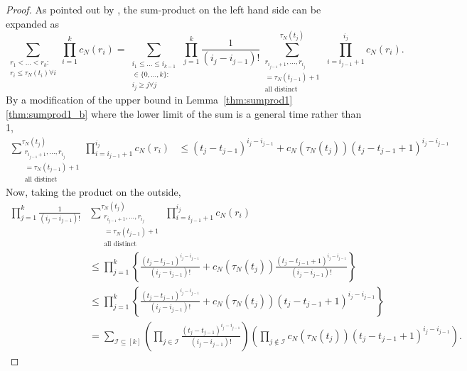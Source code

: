 \begin{proof}
As pointed out by \textcite[p.~460]{mohle1999}, the sum-product on the left hand side can be expanded as
\begin{equation*}
\sum_{\substack{r_1<\dots<r_k :\\ r_i\leq \tau_N(t_i) \forall i}} 
        \prod_{i=1}^k c_N(r_i)
= \sum_{\substack{i_1\leq \dots\leq i_{k-1}\\ \in \{0,\dots,k\} :\\ 
        i_j \geq j \forall j}} \, \prod_{j=1}^k \frac{1}{(i_j - i_{j-1})!}
        \sum_{\substack{ r_{i_{j-1}+1}, \ldots, r_{i_j} \\ = \tau_N(t_{j-1})+1 
        \\ \text{all distinct} }}^{\tau_N(t_j)}  
        \,\prod_{i=i_{j-1}+1}^{i_j} c_N(r_i) .
\end{equation*}
By a modification of the upper bound in Lemma~\ref{thm:sumprod1}\ref{thm:sumprod1_b} where the lower limit of the sum is a general time rather than 1,
\begin{align*}
\sum_{\substack{ r_{i_{j-1}+1}, \ldots, r_{i_j} \\ = \tau_N(t_{j-1})+1 
        \\ \text{all distinct} }}^{\tau_N(t_j)}  
        \prod_{i=i_{j-1}+1}^{i_j} c_N(r_i)
&\leq (t_j - t_{j-1})^{i_j - i_{j-1}} 
        + c_N(\tau_N(t_j)) ( t_j - t_{j-1} +1 )^{i_j - i_{j-1}}
\end{align*}
Now, taking the product on the outside,
\begin{align*}
\prod_{j=1}^k \frac{1}{(i_j - i_{j-1})!}
        &\sum_{\substack{ r_{i_{j-1}+1}, \ldots, r_{i_j} \\ = \tau_N(t_{j-1})+1 
        \\ \text{all distinct} }}^{\tau_N(t_j)}
        \,\prod_{i=i_{j-1}+1}^{i_j} c_N(r_i) \\
&\leq \prod_{j=1}^k \left\{ \frac{(t_j - t_{j-1})^{i_j - i_{j-1}}}{(i_j - i_{j-1})!}  
        + c_N(\tau_N(t_j)) \frac{( t_j - t_{j-1} +1 )^{i_j - i_{j-1}}}{(i_j - i_{j-1})!} \right\} 
        \\
&\leq \prod_{j=1}^k \left\{ \frac{(t_j - t_{j-1})^{i_j - i_{j-1}}}{(i_j - i_{j-1})!}  
        + c_N(\tau_N(t_j)) ( t_j - t_{j-1} +1 )^{i_j - i_{j-1}} \right\} \\
&= \sum_{\mathcal{I} \subseteq [k]} \left( \prod_{j\in\mathcal{I}} 
        \frac{(t_j - t_{j-1})^{i_j - i_{j-1}}}{(i_j - i_{j-1})!} \right)
        \left( \prod_{j\notin\mathcal{I}} c_N(\tau_N(t_j)) 
        ( t_j - t_{j-1} +1 )^{i_j - i_{j-1}} \right) .

\end{align*}
\end{proof}
